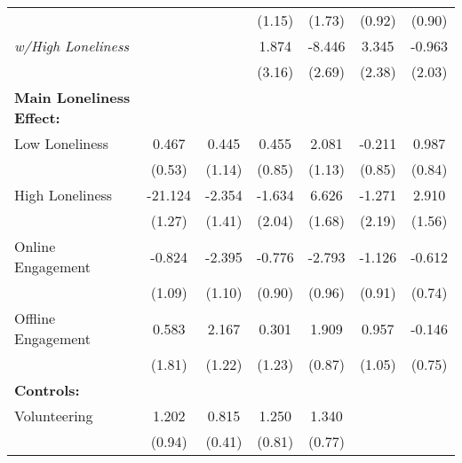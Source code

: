 \begin{table}[htbp]
\begin{tabular}{l*{6}{c}}
                              &             &             &(1.15)        &(1.73)        &(0.92)        &(0.90)        \\
\hspace{0.5cm} \emph{w/High Loneliness}&             &             &1.874        &-8.446\sym{**}&3.345        &-0.963        \\
                              &             &             &(3.16)        &(2.69)        &(2.38)        &(2.03)        \\
\midrule \textbf{Main Loneliness Effect:}&             &             &             &             &             &             \\
\hspace{0.25cm} Low Loneliness&0.467        &0.445        &0.455        &2.081\sym{^+}&-0.211        &0.987        \\
                              &(0.53)        &(1.14)        &(0.85)        &(1.13)        &(0.85)        &(0.84)        \\
\hspace{0.25cm} High Loneliness&-21.124\sym{**}&-2.354        &-1.634        &6.626\sym{**}&-1.271        &2.910\sym{^+}\\
                              &(1.27)        &(1.41)        &(2.04)        &(1.68)        &(2.19)        &(1.56)        \\
\hspace{0.25cm} Online Engagement&-0.824        &-2.395\sym{*} &-0.776        &-2.793\sym{**}&-1.126        &-0.612        \\
                              &(1.09)        &(1.10)        &(0.90)        &(0.96)        &(0.91)        &(0.74)        \\
\hspace{0.25cm} Offline Engagement&0.583        &2.167\sym{^+}&0.301        &1.909\sym{*} &0.957        &-0.146        \\
                              &(1.81)        &(1.22)        &(1.23)        &(0.87)        &(1.05)        &(0.75)        \\
\textbf{Controls:}            &             &             &             &             &             &             \\
\hspace{0.25cm} Volunteering  &1.202        &0.815\sym{^+}&1.250        &1.340\sym{^+}&             &             \\
                              &(0.94)        &(0.41)        &(0.81)        &(0.77)        &             &             \\

\end{tabular}
\end{table}
